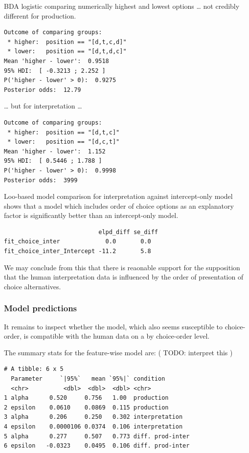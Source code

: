\documentclass{article}
\begin{document}
BDA logistic comparing numerically highest and lowest options \ldots{}
not credibly different for production.

\begin{verbatim}
Outcome of comparing groups:
 * higher:  position == "[d,t,c,d]"
 * lower:   position == "[d,t,d,c]"
Mean 'higher - lower':  0.9518
95% HDI:  [ -0.3213 ; 2.252 ]
P('higher - lower' > 0):  0.9275
Posterior odds:  12.79
\end{verbatim}

\ldots{} but for interpretation \ldots{}

\begin{verbatim}
Outcome of comparing groups:
 * higher:  position == "[d,t,c]"
 * lower:   position == "[d,c,t]"
Mean 'higher - lower':  1.152
95% HDI:  [ 0.5446 ; 1.788 ]
P('higher - lower' > 0):  0.9998
Posterior odds:  3999
\end{verbatim}

Loo-based model comparison for interpretation against intercept-only
model shows that a model which includes order of choice options as an
explanatory factor is significantly better than an intercept-only model.

\begin{verbatim}
                           elpd_diff se_diff
fit_choice_inter             0.0       0.0
fit_choice_inter_Intercept -11.2       5.8
\end{verbatim}

We may conclude from this that there is reaonable support for the
supposition that the human interpretation data is influenced by the
order of presentation of choice alternatives.

\hypertarget{model-predictions-1}{%
\subsubsection{Model predictions}\label{model-predictions-1}}

It remains to inspect whether the model, which also seems susceptible to
choice-order, is compatible with the human data on a by choice-order
level.

The summary stats for the feature-wise model are: ( { TODO: interpret
this })

\begin{verbatim}
# A tibble: 6 x 5
  Parameter     `|95%`   mean `95%|` condition
  <chr>          <dbl>  <dbl>  <dbl> <chr>
1 alpha      0.520     0.756   1.00  production
2 epsilon    0.0610    0.0869  0.115 production
3 alpha      0.206     0.250   0.302 interpretation
4 epsilon    0.0000106 0.0374  0.106 interpretation
5 alpha      0.277     0.507   0.773 diff. prod-inter
6 epsilon   -0.0323    0.0495  0.106 diff. prod-inter
\end{verbatim}
\end{document}
